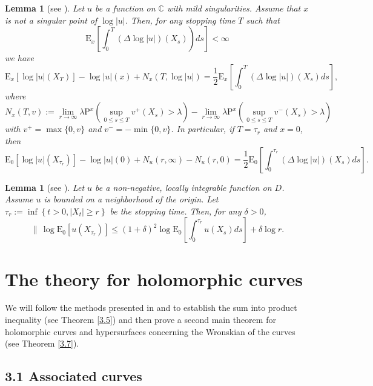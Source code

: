 \documentclass[12pt]{amsart}
\newtheorem{lemma}[theorem]{Lemma}
\begin{document}
\begin{lemma}[{see \cite[Lemma 3.2]{RCD}}]\label{2.3}
 Let $u$ be a function on $\mathbb{C}$ with mild singularities. Assume that $x$ is not a singular point of $\log |u|$. Then, for any stopping time $T$ such that
$$\left.\mathrm{E}_{x}\left[\int_{0}^{T}(\Delta \log |u|)\left(X_{s}\right)\right) d s\right]<\infty$$
we have
$$\mathrm{E}_{x}\left[\log |u|\left(X_{T}\right)\right]-\log |u|(x)+N_{x}(T, \log |u|)=\frac{1}{2} \mathrm{E}_{x}\left[\int_{0}^{T}(\Delta \log |u|)\left(X_{s}\right) d s\right],$$
where
$$N_{x}(T, v):=\lim _{r \rightarrow \infty} \lambda \mathrm{P}^{x}\left(\sup _{0 \le s \le T} v^{+}\left(X_{s}\right)>\lambda\right)-\lim _{r \rightarrow \infty} \lambda \mathrm{P}^{x}\left(\sup _{0 \le s \le T} v^{-}\left(X_{s}\right)>\lambda\right)$$
with $v^{+}=\max \{0, v\}$ and $v^{-}=-\min \{0, v\}$. In particular, if $T=\tau_{r}$ and $x=0$, then
$$\mathrm{E}_{0}\left[\log |u|\left(X_{\tau_{r}}\right)\right]-\log |u|(0)+N_{u}(r, \infty)-N_{u}(r, 0)=\frac{1}{2} \mathrm{E}_{0}\left[\int_{0}^{\tau_{r}}(\Delta \log |u|)\left(X_{s}\right) d s\right].$$
\end{lemma}

\begin{lemma}[{see \cite[Lemma 3.5]{RCD}}]\label{2.4}
Let $u$ be a non-negative, locally integrable function on $D$. Assume $u$ is bounded on a neighborhood of the origin. Let $\tau_{r}:=\inf \left\{t>0,\left|X_{t}\right| \ge r\right\}$ be the stopping time. Then, for any $\delta>0$,
$$ \|\, \log \mathrm{E}_{0}\left[u\left(X_{\tau_{r}}\right)\right] \leqslant(1+\delta)^{2} \log \mathrm{E}_{0}\left[\int_{0}^{\tau_{r}} u\left(X_{s}\right) d s\right]+\delta \log r.$$
\end{lemma}

\section{The theory for holomorphic curves}

We will follow the methods presented in \cite{RCD} and \cite{Q24} to establish the sum into product inequality (see Theorem \ref{3.5}) and then prove a second main theorem for holomorphic curves and hypersurfaces concerning the Wronskian of the curves (see Theorem \ref{3.7}).

\subsection*{3.1 Associated curves}
\end{document}
